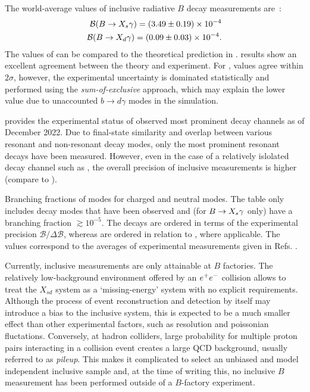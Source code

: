 The world-average values of inclusive radiative $B$ decay measurements are~\cite{Amhis:2022mac,Workman:2022ynf}:
\begin{align}\label{eq:btosgamma_experimental}
    \begin{split}
    \mathcal{B}(\BtoXsgamma)=(3.49\pm 0.19)\times10^{-4}\\
    \mathcal{B}(\BtoXdgamma)=(0.09\pm 0.03)\times10^{-4}.
    \end{split}
\end{align}
The values of  can be compared to the theoretical prediction in .
\BtoXsgamma results show an excellent agreement between the theory and experiment.
For \BtoXdgamma, values agree within $2\sigma$, however, the experimental uncertainty is dominated statistically 
and performed using the \textit{sum-of-exclusive} approach, which may explain the lower value due to unaccounted $b\rightarrow d\gamma$ modes in the simulation.

 provides the experimental status of observed most prominent \BtoXsdgamma decay channels as of December 2022.
Due to final-state similarity and overlap between various resonant and non-resonant decay modes, only the most prominent resonant decays have been measured.
However, even in the case of a relatively islolated decay channel such as \BtoKstargamma, the overall precision of inclusive measurements is higher (compare to ).

{\renewcommand{\arraystretch}{1.2}
\begin{table}[!htbp]
    \centering
    \caption{\label{tab:btosgamma_bfs} 
    Branching fractions of \BtoXsgamma modes for charged and neutral modes.
    The table only includes decay modes that have been observed and (for $\BtoXsgamma$ only) have a branching fraction $\gtrsim10^{-5}$.
    The \Bp decays are ordered in terms of the experimental precision $\mathcal{B}/\Delta\mathcal{B}$, whereas \Bz are ordered in relation to \Bp, where applicable.
    The values correspond to the averages of experimental measurements given in Refs. \cite{Amhis:2022mac,Workman:2022ynf}.
    }
    
\end{table}
}

Currently, inclusive measurements are only attainable at $B$ factories.
The relatively low-background environment offered by an $e^+e^-$ collision allows to treat the $X_{sd}$ system as a `missing-energy' system with no explicit requirements.
Although the process of event reconstruction and detection by itself may introduce a bias to the inclusive system, this is expected to be a much smaller effect than other experimental factors, such as resolution and poissonian fluctations.
Conversely, at hadron colliders, large probability for multiple proton pairs interacting in a collision event creates a large QCD background, usually referred to as \textit{pileup}.
This makes it complicated to select an unbiased and model independent inclusive sample and,
at the time of writing this, no inclusive $B$ measurement has been performed outside of a $B$-factory experiment.

